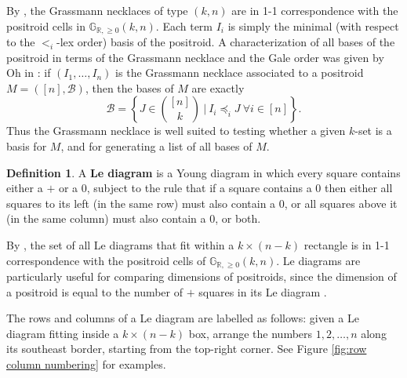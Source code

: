 \documentclass[11pt]{article}
\newcommand{\R}{\mathbb{R}}
\newcommand{\Gr}{\mathbb{G}_{\R, \geq 0}}
\newcommand{\cB}{\mathcal{B}}
\newcommand{\gale}[1]{\preccurlyeq_{#1}}
\theoremstyle{remark}
\theoremstyle{definition}
\newtheorem{dfn}[thm]{Definition}
\begin{document}
By \cite[Theorem 17.1]{Postnikov}, the Grassmann necklaces of type $(k,n)$ are in 1-1 correspondence with the positroid cells in $\Gr(k,n)$. Each term $I_i$ is simply the minimal (with respect to the $<_i$-lex order) basis of the positroid. A characterization of all bases of the positroid in terms of the Grassmann necklace and the Gale order was given by Oh in \cite[Theorem 8]{Oh}: if $(I_1, \dots, I_n)$ is the Grassmann necklace associated to a positroid $M = ([n],\cB)$, then the bases of $M$ are exactly
\[\cB = \left\{J \in \binom{[n]}{k}\ |\ I_i \gale{i} J \ \forall i \in [n]\right\}.\]
Thus the Grassmann necklace is well suited to testing whether a given $k$-set is a basis for $M$, and for generating a list of all bases of $M$.


\begin{dfn}\label{def:le diagram}
A {\bf Le diagram} is a Young diagram in which every square contains either a $+$ or a $0$, subject to the rule that if a square contains a $0$ then either all squares to its left (in the same row) must also contain a $0$, or all squares above it (in the same column) must also contain a $0$, or both.
\end{dfn}

By \cite[Theorem 6.5]{Postnikov}, the set of all Le diagrams that fit within a $k\times(n-k)$ rectangle is in 1-1 correspondence with the positroid cells of $\Gr(k,n)$. Le diagrams are particularly useful for comparing dimensions of positroids, since the dimension of a positroid is equal to the number of $+$ squares in its Le diagram \cite[Theorem 6.5]{Postnikov}.

The rows and columns of a Le diagram are labelled as follows: given a Le diagram fitting inside a $k\times (n-k)$ box, arrange the numbers $1,2, \dots, n$ along its southeast border, starting from the top-right corner. See Figure \ref{fig:row column numbering} for examples.
\end{document}
